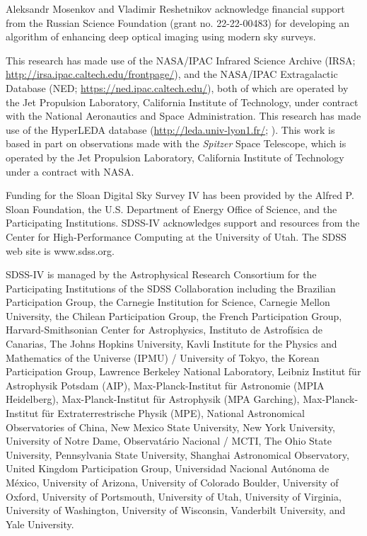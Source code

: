 \documentclass{raa}
\begin{document}
\begin{acknowledgements}

Aleksandr Mosenkov and Vladimir Reshetnikov acknowledge financial support from the Russian Science Foundation
(grant no. 22-22-00483) for developing an algorithm of enhancing deep optical imaging using modern sky surveys.

This research has made use of the NASA/IPAC Infrared Science Archive (IRSA; \url{http://irsa.ipac.caltech.edu/frontpage/}), and the NASA/IPAC Extragalactic Database (NED; \url{https://ned.ipac.caltech.edu/}), both of which are operated by the Jet Propulsion Laboratory, California Institute of Technology, under contract with the National Aeronautics and Space Administration.  This research has made use of the HyperLEDA database (\url{http://leda.univ-lyon1.fr/}; \citealp{2014A&A...570A..13M}). 
This work is based in part on observations made with the {\it Spitzer} Space Telescope, which is operated by the Jet Propulsion Laboratory, California Institute of Technology under a contract with NASA. 

Funding for the Sloan Digital Sky Survey IV has been provided by the Alfred P. Sloan Foundation, the U.S. Department of Energy Office of Science, and the Participating Institutions. SDSS-IV acknowledges
support and resources from the Center for High-Performance Computing at
the University of Utah. The SDSS web site is www.sdss.org.

SDSS-IV is managed by the Astrophysical Research Consortium for the 
Participating Institutions of the SDSS Collaboration including the 
Brazilian Participation Group, the Carnegie Institution for Science, 
Carnegie Mellon University, the Chilean Participation Group, the French Participation Group, Harvard-Smithsonian Center for Astrophysics, 
Instituto de Astrof\'isica de Canarias, The Johns Hopkins University, Kavli Institute for the Physics and Mathematics of the Universe (IPMU) / 
University of Tokyo, the Korean Participation Group, Lawrence Berkeley National Laboratory, 
Leibniz Institut f\"ur Astrophysik Potsdam (AIP),  
Max-Planck-Institut f\"ur Astronomie (MPIA Heidelberg), 
Max-Planck-Institut f\"ur Astrophysik (MPA Garching), 
Max-Planck-Institut f\"ur Extraterrestrische Physik (MPE), 
National Astronomical Observatories of China, New Mexico State University, 
New York University, University of Notre Dame, 
Observat\'ario Nacional / MCTI, The Ohio State University, 
Pennsylvania State University, Shanghai Astronomical Observatory, 
United Kingdom Participation Group,
Universidad Nacional Aut\'onoma de M\'exico, University of Arizona, 
University of Colorado Boulder, University of Oxford, University of Portsmouth, 
University of Utah, University of Virginia, University of Washington, University of Wisconsin, 
Vanderbilt University, and Yale University.


\end{acknowledgements}
\end{document}
